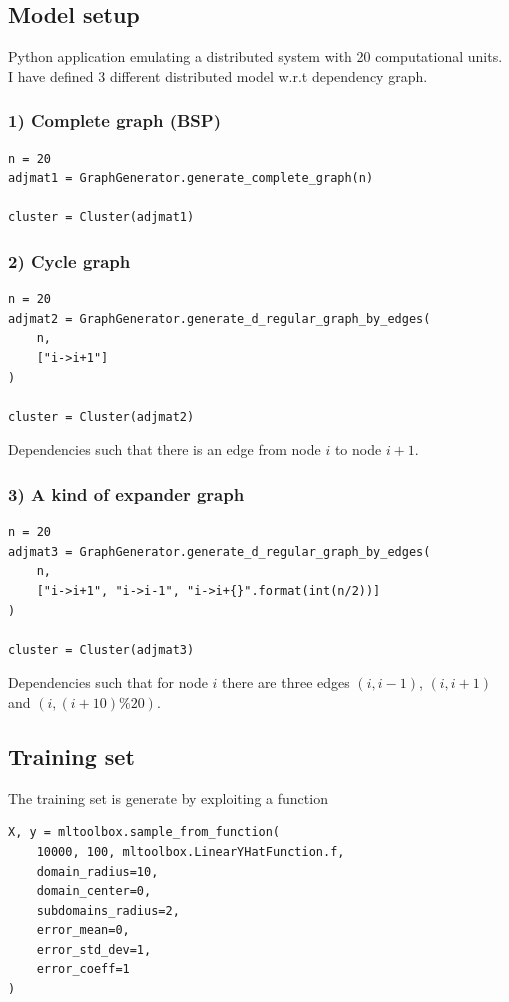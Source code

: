 \documentclass[a4paper,12pt]{article}
\theoremstyle{newplanestyle}
\theoremstyle{newdefinitionstyle}
\theoremstyle{newprovestyle}
\begin{document}
\subsection*{Model setup}
Python application emulating a distributed system with 20 computational units.
\\
I have defined 3 different distributed model w.r.t dependency graph.

\subsubsection*{1) Complete graph (BSP)}
\begin{lstlisting}
n = 20
adjmat1 = GraphGenerator.generate_complete_graph(n)

cluster = Cluster(adjmat1)
\end{lstlisting}
\vspace{1em}

\subsubsection*{2) Cycle graph}
\begin{lstlisting}
n = 20
adjmat2 = GraphGenerator.generate_d_regular_graph_by_edges(
    n,
    ["i->i+1"]
)

cluster = Cluster(adjmat2)
\end{lstlisting}
Dependencies such that there is an edge from node $i$ to node $i+1$.
\vspace{2em}


\subsubsection*{3) A kind of expander graph}
\begin{lstlisting}
n = 20
adjmat3 = GraphGenerator.generate_d_regular_graph_by_edges(
    n,
    ["i->i+1", "i->i-1", "i->i+{}".format(int(n/2))]
)

cluster = Cluster(adjmat3)
\end{lstlisting}
Dependencies such that for node $i$ there are three edges $(i,i-1)$, $(i,i+1)$ and $(i,(i+10)\%20)$.
\vspace{2em}


\subsection*{Training set}
The training set is generate by exploiting a function 

\begin{lstlisting}
X, y = mltoolbox.sample_from_function(
    10000, 100, mltoolbox.LinearYHatFunction.f,
    domain_radius=10,
    domain_center=0,
    subdomains_radius=2,
    error_mean=0,
    error_std_dev=1,
    error_coeff=1
)
\end{lstlisting}
\end{document}
